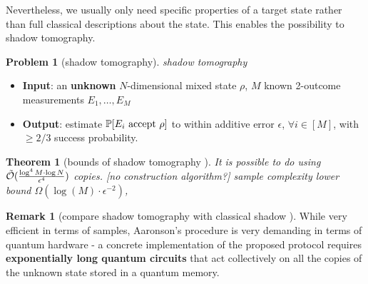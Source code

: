 \documentclass[
reprint,
aps,
pra,
floatfix,
]{revtex4-2}
\theoremstyle{plain}
\newtheorem{theorem}{Theorem}
\theoremstyle{definition}
\newtheorem{problem}{Problem}
\newtheorem{remark}{Remark}
\newcommand{\dm}{\rho}
\begin{document}
Nevertheless, we usually only need specific properties of a target state rather than full classical descriptions about the state.
This enables the possibility to shadow tomography.
\begin{problem}[shadow tomography]\label{prm:shadow_tomography}
	\emph{shadow tomography}
	\begin{itemize}
		\item \textbf{Input}: an \textbf{unknown} $N$-dimensional mixed state $\rho$, $M$ known 2-outcome measurements $E_1,\dots,E_M$
		\item \textbf{Output}: estimate $\probability[E_i \text{ accept } \dm]$ to within additive error $\epsilon$, $\forall i\in [M]$, with $\ge 2/3$ success probability.	
	\end{itemize}
\end{problem}
\begin{theorem}[bounds of shadow tomography \cite{aaronsonShadowTomographyQuantum2018}]\label{thm:shadow_tomography}
	It is possible to do  using $\tilde{\mathcal{O}}(\frac{\log^4 M\cdot \log N}{\epsilon^4})$ copies. [no construction algorithm?]
	sample complexity lower bound $\Omega(\log (M) \cdot \epsilon^{-2})$, 
\end{theorem}
\begin{remark}[compare shadow tomography with classical shadow \cite{huangPredictingManyProperties2020}]
	While very efficient in terms of samples, Aaronson's procedure is very demanding in terms of quantum hardware - a concrete implementation of the proposed protocol requires \textbf{exponentially long quantum circuits} that act collectively on all the copies of the unknown state stored in a quantum memory.
\end{remark}
\end{document}
